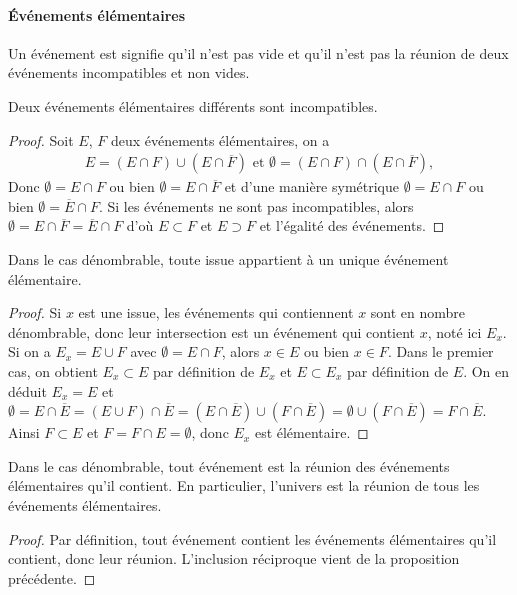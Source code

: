 \paragraph{Événements élémentaires}
\begin{definition}
Un événement est  signifie qu'il n'est pas vide et qu'il n'est pas la réunion de
deux événements incompatibles et non vides.
\end{definition}
%
\begin{theorem}
Deux événements élémentaires différents sont incompatibles.
\end{theorem}
\begin{proof}
Soit \(𝐸\), \(𝐹\) deux événements élémentaires, on a
\begin{gather*}
𝐸=(𝐸∩𝐹)∪(𝐸∩\overline{𝐹})\text{ et }∅=(𝐸∩𝐹)∩(𝐸∩\overline{𝐹}),
\end{gather*}
Donc \(∅=𝐸∩𝐹\) ou bien \(∅=𝐸∩\overline{𝐹}\) et d'une manière symétrique
\(∅=𝐸∩𝐹\) ou bien \(∅=\overline{𝐸}∩𝐹\). Si les événements ne sont pas incompatibles,
alors \(∅=𝐸∩\overline{𝐹}=\overline{𝐸}∩𝐹\) d'où \(𝐸⊂𝐹\) et \(𝐸⊃𝐹\) et l'égalité des événements.
\end{proof}
\begin{theorem}
Dans le cas dénombrable, toute issue appartient à un unique événement élémentaire.
\end{theorem}
\begin{proof}
Si \(𝑥\) est une issue, les événements qui contiennent \(𝑥\) sont en nombre dénombrable, donc leur
intersection est un événement qui contient \(𝑥\), noté ici \(𝐸_{𝑥}\).
Si on a \(𝐸_{𝑥}=𝐸∪𝐹\) avec \(∅=𝐸∩𝐹\), alors \(𝑥∈𝐸\) ou bien \(𝑥∈𝐹\). Dans le premier cas, on obtient \(𝐸_{𝑥}⊂𝐸\) par définition de
\(𝐸_{𝑥}\) et \(𝐸⊂𝐸_{𝑥}\) par définition de \(𝐸\).
On en déduit \(𝐸_{𝑥}=𝐸\) et
\(∅=𝐸∩\overline{𝐸}=(𝐸∪𝐹)∩\overline{𝐸}=(𝐸∩\overline{𝐸})∪(𝐹∩\overline{𝐸})=∅∪(𝐹∩\overline{𝐸})=𝐹∩\overline{𝐸}\).
Ainsi \(𝐹⊂𝐸\) et \(𝐹=𝐹∩𝐸=∅\), donc \(𝐸_{𝑥}\) est élémentaire.
\end{proof}
\begin{theorem}
Dans le cas dénombrable, tout événement est la réunion des événements élémentaires qu'il contient. En
particulier, l'univers est la réunion de tous les événements élémentaires.
\end{theorem}
\begin{proof}
Par définition, tout événement contient les événements élémentaires qu'il contient, donc leur réunion.
L'inclusion réciproque vient de la proposition précédente.
\end{proof}
